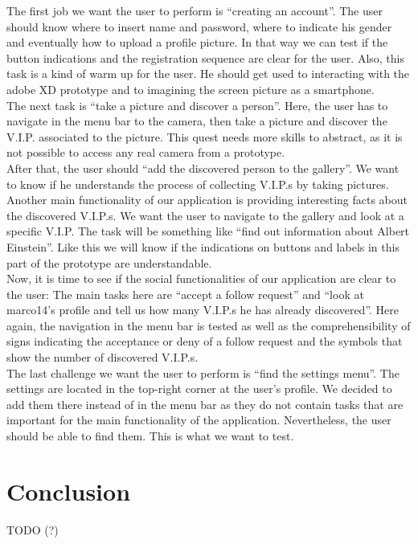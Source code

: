 \documentclass[12pt]{scrartcl}
\begin{document}
		The first job we want the user to perform is “creating an account”. The user should know where to insert name and password, where to indicate his 			gender and eventually how to upload a profile picture. In that way we can test if the button indications and the registration sequence are clear for the 		user. Also, this task is a kind of warm up for the user. He should get used to interacting with the adobe XD prototype and to imagining the screen picture 		as a smartphone.\\

		The next task is “take a picture and discover a person”. Here, the user has to navigate in the menu bar to the camera, then take a picture and discover 		the V.I.P. associated to the picture. This quest needs more skills to abstract, as it is not possible to access any real camera from a prototype.\\

		After that, the user should “add the discovered person to the gallery”. We want to know if he understands the process of collecting V.I.P.s by taking 			pictures.\\

 		Another main functionality of our application is providing interesting facts about the discovered V.I.P.s. We want the user to navigate to the gallery and 		look at a specific V.I.P. The task will be something like “find out information about Albert Einstein”. Like this we will know if the indications on buttons and 		labels in this part of the prototype are understandable.\\

		Now, it is time to see if the social functionalities of our application are clear to the user: The main tasks here are “accept a follow request” and “look at 		marco14’s profile and tell us how many V.I.P.s he has already discovered”. Here again, the navigation in the menu bar is tested as well as the 				comprehensibility of signs indicating the acceptance or deny of a follow request and the symbols that show the number of discovered V.I.P.s.\\

		The last challenge we want the user to perform is “find the settings menu”. The settings are located in the top-right corner at the user’s profile. We 			decided to add them there instead of in the menu bar as they do not contain tasks that are important for the main functionality of the application. 			Nevertheless, the user should be able to find them. This is what we want to test.\\

			
\section{Conclusion}

	
	TODO (?)
\end{document}
